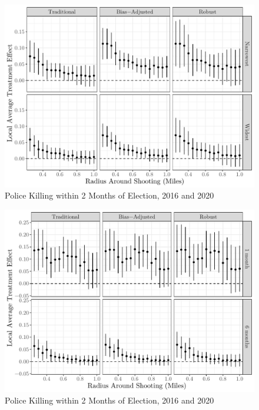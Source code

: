 \documentclass[
  12pt,
]{article}
\begin{document}
\begin{figure}[h]

{\centering \includegraphics{shoot_to_files/figure-latex/bws-2-1} 

}

\caption{\label{fig:map}Police Killing within 2 Months of Election, 2016 and 2020}\label{fig:bws-2}
\end{figure}

\begin{figure}[h]

{\centering \includegraphics{shoot_to_files/figure-latex/bws-4-1} 

}

\caption{\label{fig:map}Police Killing within 2 Months of Election, 2016 and 2020}\label{fig:bws-4}
\end{figure}
\end{document}
